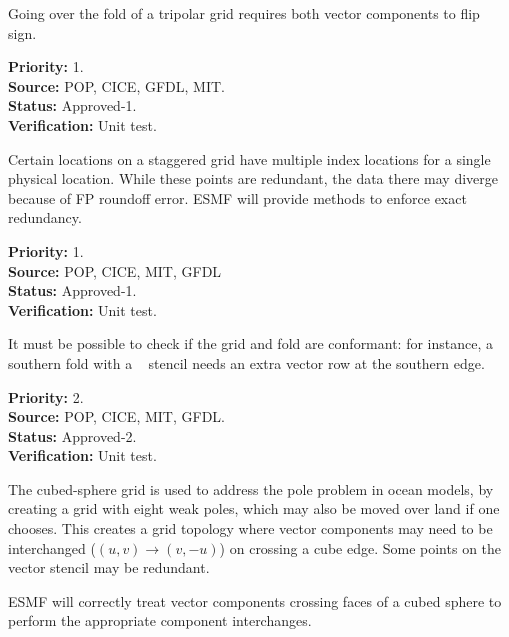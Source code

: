 Going over the fold of a tripolar grid requires both vector components
to flip sign.

\begin{reqlist}
{\bf Priority:} 1. \\ 
{\bf Source:} POP, CICE, GFDL, MIT. \\
{\bf Status:} Approved-1. \\
{\bf Verification:} Unit test. \\
\end{reqlist}


Certain locations on a staggered grid have multiple index locations
for a single physical location. While these points are redundant, the
data there may diverge because of FP roundoff error. ESMF will provide
methods to enforce exact redundancy.

\begin{reqlist}
{\bf Priority:} 1. \\ 
{\bf Source:} POP, CICE, MIT, GFDL \\
{\bf Status:} Approved-1. \\
{\bf Verification:} Unit test. 
\end{reqlist}


It must be possible to check if the grid and fold are conformant:
for instance, a southern fold with a \bgrid~ stencil needs an extra
vector row at the southern edge.

\begin{reqlist}
{\bf Priority:} 2. \\ 
{\bf Source:} POP, CICE, MIT, GFDL. \\
{\bf Status:} Approved-2. \\
{\bf Verification:} Unit test. 
\end{reqlist}


The cubed-sphere grid \cite{ref:rpm1996} is used to address the pole
problem in ocean models, by creating a grid with eight weak poles,
which may also be moved over land if one chooses. This creates a grid
topology where vector components may need to be interchanged
($(u,v)\longrightarrow(v,-u)$) on crossing a cube edge. Some points on
the vector stencil may be redundant.


ESMF will correctly treat vector components crossing faces of a cubed
sphere to perform the appropriate component interchanges.

